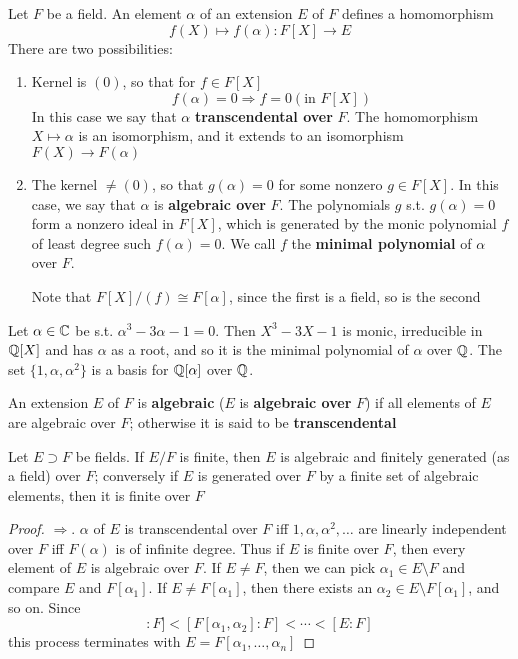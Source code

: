 \documentclass[11pt]{article}
\begin{document}
Let \(F\) be a field. An element \(\alpha\) of an extension \(E\) of \(F\) defines a homomorphism
\begin{equation*}
f(X)\mapsto f(\alpha):F[X]\to E
\end{equation*}
There are two possibilities:
\begin{enumerate}
\item Kernel is \((0)\), so that for \(f\in F[X]\)
\begin{equation*}
f(\alpha)=0\Rightarrow f=0 (\text{in }F[X])
\end{equation*}
In this case we say that \(\alpha\) \textbf{transcendental over} \(F\). The homomorphism \(X\mapsto\alpha\) is an
isomorphism, and it extends to an isomorphism \(F(X)\to F(\alpha)\)
\item The kernel \(\neq(0)\), so that \(g(\alpha)=0\) for some nonzero \(g\in F[X]\). In this case, we say
that \(\alpha\) is \textbf{algebraic over} \(F\).  The polynomials \(g\) s.t. \(g(\alpha)=0\) form a nonzero ideal
in \(F[X]\), which is generated by the monic polynomial \(f\) of least degree
such \(f(\alpha)=0\). We call \(f\) the \textbf{minimal polynomial} of \(\alpha\) over \(F\).

Note that \(F[X]/(f)\cong F[\alpha]\), since the first is a field, so is the second
\end{enumerate}


\begin{examplle}[]
Let \(\alpha\in\mathbb{C}\) be s.t. \(\alpha^3-3\alpha-1=0\). Then \(X^3-3X-1\) is monic, irreducible in \(\mathbb{Q}[X]\) and  has
\(\alpha\) as a root, and so it is the minimal polynomial of \(\alpha\) over \(\mathbb{Q}\). The set \(\{1,\alpha,\alpha^2\}\) is a
basis for \(\mathbb{Q}[\alpha]\) over \(\mathbb{Q}\).
\end{examplle}

An extension \(E\) of \(F\) is \textbf{algebraic} (\(E\) is \textbf{algebraic over} \(F\)) if all elements
of \(E\) are algebraic over \(F\); otherwise it is said to be \textbf{transcendental}

\begin{proposition}[]
Let \(E\supset F\) be fields. If \(E/F\) is finite, then \(E\) is algebraic and finitely generated (as
a field) over \(F\); conversely if \(E\) is generated over \(F\) by a finite set of algebraic
elements, then it is finite over \(F\)
\end{proposition}

\begin{proof}
\(\Rightarrow\). \(\alpha\) of \(E\) is transcendental over \(F\) iff \(1,\alpha,\alpha^2,\dots\) are linearly independent
over \(F\) iff \(F(\alpha)\) is of infinite degree. Thus if \(E\) is finite over \(F\), then every
element of \(E\) is algebraic over \(F\). If \(E\neq F\), then we can pick \(\alpha_1\in E\setminus F\) and
compare \(E\) and \(F[\alpha_1]\). If \(E\neq F[\alpha_1]\), then there exists an \(\alpha_2\in E\setminus F[\alpha_1]\), and so on.
Since
\begin{equation*}
[F[\alpha_1]:F]<[F[\alpha_1,\alpha_2]:F]<\cdots<[E:F]
\end{equation*}
this process terminates with \(E=F[\alpha_1,\dots,\alpha_n]\)
\end{proof}
\end{document}
